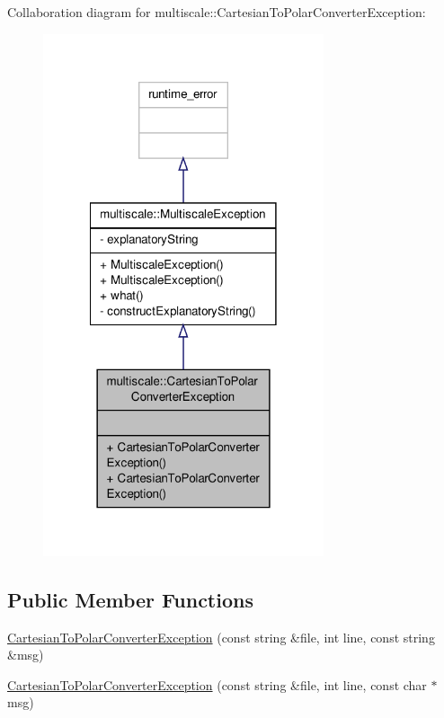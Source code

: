 Collaboration diagram for multiscale\-:\-:Cartesian\-To\-Polar\-Converter\-Exception\-:
\nopagebreak
\begin{figure}[H]
\begin{center}
\leavevmode
\includegraphics[width=234pt]{classmultiscale_1_1CartesianToPolarConverterException__coll__graph}
\end{center}
\end{figure}
\subsection*{Public Member Functions}
\begin{DoxyCompactItemize}
\item 
\hyperlink{classmultiscale_1_1CartesianToPolarConverterException_a70f2259e58ab16d64d88e8728fd67f26}{Cartesian\-To\-Polar\-Converter\-Exception} (const string \&file, int line, const string \&msg)
\item 
\hyperlink{classmultiscale_1_1CartesianToPolarConverterException_a9d77f79a95ff2557a6cd5060021c70c2}{Cartesian\-To\-Polar\-Converter\-Exception} (const string \&file, int line, const char $\ast$msg)
\end{DoxyCompactItemize}


